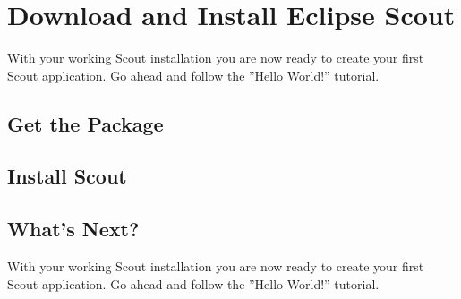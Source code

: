 \documentclass{article}
\begin{document}
\section*{Download and Install Eclipse Scout}

With your working Scout installation you are now ready to create your first Scout application. 
Go ahead and follow the ''Hello World!'' tutorial.

\subsection*{Get the Package}

\subsection*{Install Scout}


\subsection*{What's Next?}

With your working Scout installation you are now ready to create your first Scout application. 
Go ahead and follow the ''Hello World!'' tutorial.
\end{document}
